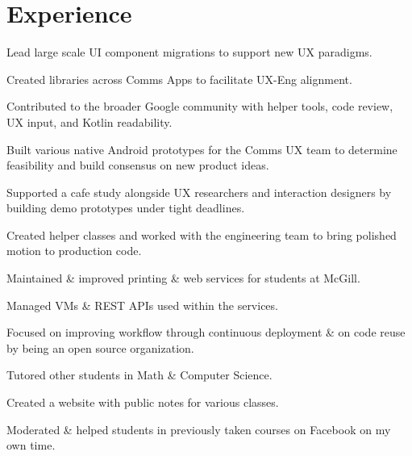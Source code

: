\documentclass[]{allanwang-resume}
\begin{document}
\begin{minipage}[t]{0.66\textwidth}

	\section{Experience}
	
	\vspace{\topsep} %
	\begin{tightemize}
		\item Lead large scale UI component migrations to support new UX paradigms.
		\item Created libraries across Comms Apps to facilitate UX-Eng alignment.
		\item Contributed to the broader Google community with helper tools, code review, UX input, and Kotlin readability.
	\end{tightemize}

	\begin{tightemize}
		\item Built various native Android prototypes for the Comms UX team to determine feasibility and build consensus on new product ideas.
		\item Supported a cafe study alongside UX researchers and interaction designers by building demo prototypes under tight deadlines.
		\item Created helper classes and worked with the engineering team to bring polished motion to production code.
	\end{tightemize}

	\begin{tightemize}
		\item Maintained \& improved printing \& web services for students at McGill.
		\item Managed VMs \& REST APIs used within the services.
		\item Focused on improving workflow through continuous deployment \& on code reuse by being an open source organization.
	\end{tightemize}

	\begin{tightemize}
		\item Tutored other students in Math \& Computer Science.
		\item Created a website with public notes for various classes.
		\item Moderated \& helped students in previously taken courses on Facebook on my own time.
	\end{tightemize}


\end{minipage}
\end{document}
